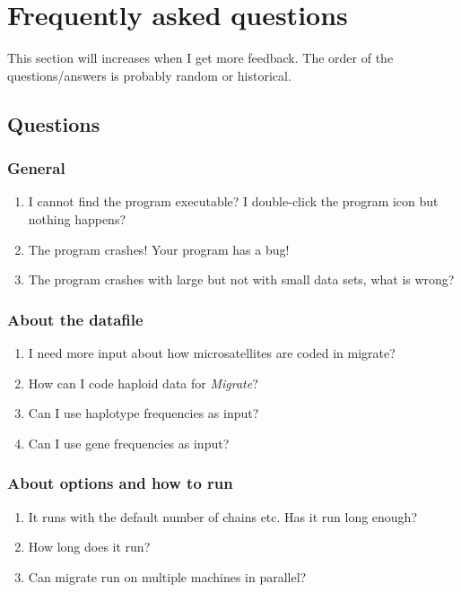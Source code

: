 \chapter{Frequently asked questions}
This section will increases when I get more feedback.
The order of the questions/answers  is probably random or historical. 
\section{Questions}
\subsection{General}
\begin{enumerate}
\item I cannot find the program executable? I double-click the program icon but nothing happens?
\item The program crashes! Your program has a bug!
\item The program crashes with large but not with small data sets, 
what is wrong?
\end{enumerate}

\subsection{About the datafile}
\begin{enumerate}
\item I need more input about how microsatellites are coded in migrate?
\item How can I code haploid data for {\it Migrate}?
\item Can I use haplotype frequencies as input?
\item Can I use gene frequencies as input?
\end{enumerate}
\subsection{About options and how to run}
\begin{enumerate}
\item It runs with the default number of chains etc. Has it run
long enough?
\item How long does it run?
\item Can migrate run on multiple machines in parallel?
\end{enumerate}

